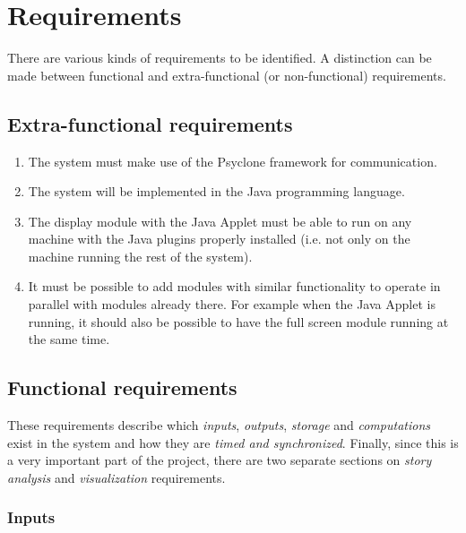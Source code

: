 \chapter{\label{cpt:requirements}Requirements}

There are various kinds of requirements to be identified. A distinction can be
made between functional and extra-functional (or non-functional) requirements.

\section{Extra-functional requirements}

\begin{enumerate}
  \item The system must make use of the Psyclone framework for communication.
  \item The system will be implemented in the Java programming language.
  \item The display module with the Java Applet must be able to run on any
        machine with the Java plugins properly installed (i.e. not only on the
        machine running the rest of the system).
  \item It must be possible to add modules with similar functionality to
        operate in parallel with modules already there. For example when the
        Java Applet is running, it should also be possible to have the full
        screen module running at the same time. 
\end{enumerate}

\section{Functional requirements}

These requirements describe which \emph{inputs}, \emph{outputs}, \emph{storage}
and \emph{computations} exist in the system and how they are \emph{timed and
synchronized}. Finally, since this is a very important part of the project,
there are two separate sections on \emph{story analysis} and
\emph{visualization} requirements.

\subsection{Inputs}

